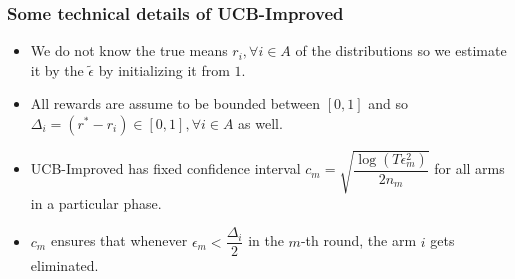 \begin{frame}
\frametitle{Some technical details of UCB-Improved}
\begin{itemize}
\item<1-> We do not know the true means $r_i ,\forall i\in A$ of the distributions so we estimate it by the $\tilde{\epsilon}$ by initializing it from $1$.
\item<2-> All rewards are assume to be bounded between $[0,1]$ and so $\Delta_{i} = (r^* - r_i)\in [0,1],\forall i\in A$ as well.
\item<3-> UCB-Improved has fixed confidence interval  $c_{m}=\sqrt{\dfrac{\log{(T{\epsilon}_{m}^{2})}}{2 n_{m}}}$ for all arms in a particular phase.
\item<4-> $c_m$ ensures that whenever ${\epsilon}_{m}<\dfrac{\Delta_i}{2}$ in the $m$-th round, the arm $i$ gets eliminated.
\end{itemize}
\end{frame}
